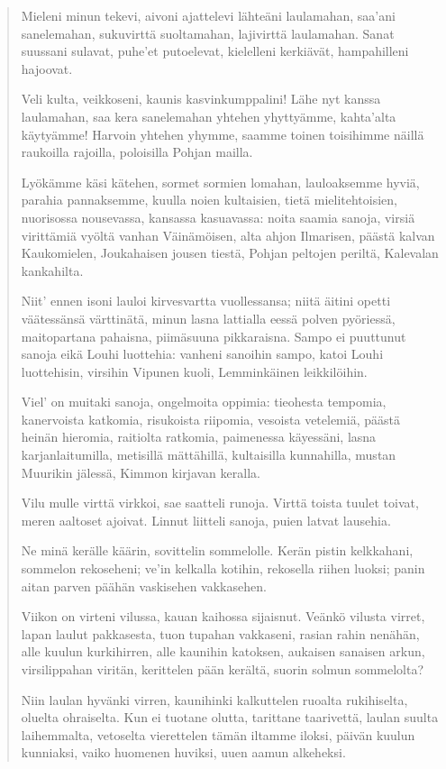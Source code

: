 \documentclass{article}
\begin{document}
\begin{verse}
Mieleni minun tekevi, aivoni ajattelevi
lähteäni laulamahan, saa’ani sanelemahan,
sukuvirttä suoltamahan, lajivirttä laulamahan.
Sanat suussani sulavat, puhe’et putoelevat,
kielelleni kerkiävät, hampahilleni hajoovat.

Veli kulta, veikkoseni, kaunis kasvinkumppalini!
Lähe nyt kanssa laulamahan, saa kera sanelemahan
yhtehen yhyttyämme, kahta’alta käytyämme!
Harvoin yhtehen yhymme, saamme toinen toisihimme
näillä raukoilla rajoilla, poloisilla Pohjan mailla.

Lyökämme käsi kätehen, sormet sormien lomahan,
lauloaksemme hyviä, parahia pannaksemme,
kuulla noien kultaisien, tietä mielitehtoisien,
nuorisossa nousevassa, kansassa kasuavassa:
noita saamia sanoja, virsiä virittämiä
vyöltä vanhan Väinämöisen, alta ahjon Ilmarisen,
päästä kalvan Kaukomielen, Joukahaisen jousen tiestä,
Pohjan peltojen periltä, Kalevalan kankahilta.

Niit’ ennen isoni lauloi kirvesvartta vuollessansa;
niitä äitini opetti väätessänsä värttinätä,
minun lasna lattialla eessä polven pyöriessä,
maitopartana pahaisna, piimäsuuna pikkaraisna.
Sampo ei puuttunut sanoja eikä Louhi luottehia:
vanheni sanoihin sampo, katoi Louhi luottehisin,
virsihin Vipunen kuoli, Lemminkäinen leikkilöihin.

Viel’ on muitaki sanoja, ongelmoita oppimia:
tieohesta tempomia, kanervoista katkomia,
risukoista riipomia, vesoista vetelemiä,
päästä heinän hieromia, raitiolta ratkomia,
paimenessa käyessäni, lasna karjanlaitumilla,
metisillä mättähillä, kultaisilla kunnahilla,
mustan Muurikin jälessä, Kimmon kirjavan keralla.

Vilu mulle virttä virkkoi, sae saatteli runoja.
Virttä toista tuulet toivat, meren aaltoset ajoivat.
Linnut liitteli sanoja, puien latvat lausehia.

Ne minä kerälle käärin, sovittelin sommelolle.
Kerän pistin kelkkahani, sommelon rekoseheni;
ve’in kelkalla kotihin, rekosella riihen luoksi;
panin aitan parven päähän vaskisehen vakkasehen.

Viikon on virteni vilussa, kauan kaihossa sijaisnut.
Veänkö vilusta virret, lapan laulut pakkasesta,
tuon tupahan vakkaseni, rasian rahin nenähän,
alle kuulun kurkihirren, alle kaunihin katoksen,
aukaisen sanaisen arkun, virsilippahan viritän,
kerittelen pään kerältä, suorin solmun sommelolta?

Niin laulan hyvänki virren, kaunihinki kalkuttelen
ruoalta rukihiselta, oluelta ohraiselta.
Kun ei tuotane olutta, tarittane taarivettä,
laulan suulta laihemmalta, vetoselta vierettelen
tämän iltamme iloksi, päivän kuulun kunniaksi,
vaiko huomenen huviksi, uuen aamun alkeheksi.
\end{verse}
\end{document}
